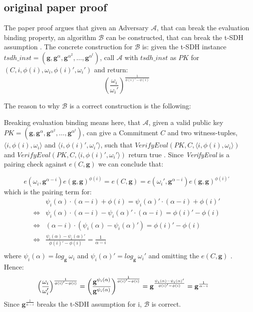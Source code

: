 \subsection{original paper proof}
The paper proof argues that given an Adversary $\mathcal{A}$, that can break the evaluation binding property, an algorithm $\mathcal{B}$ can be constructed, that can break the t-SDH assumption \parencite{KZG}. The concrete construction for $\mathcal{B}$ is: given the t-SDH instance $tsdh\_inst =(\mathbf{g}, \mathbf{g}^{\alpha}, \mathbf{g}^{\alpha^2},\dots, \mathbf{g}^{\alpha^t})$, call $\mathcal{A}$ with $tsdh\_inst$ as $PK$ for $(C,i,\phi(i),\omega_i,\phi(i)',\omega_i')$ and return: 
$$(\frac{\omega_i}{\omega_i'})^{\frac{1}{\phi(i)'-\phi(i)}}$$

The reason to why $\mathcal{B}$ is a correct construction is the following: 

Breaking evaluation binding means here, that $\mathcal{A}$, given a valid public key $PK=(\mathbf{g}, \mathbf{g}^{\alpha}, \mathbf{g}^{\alpha^2},\dots, \mathbf{g}^{\alpha^t})$, can give a Commitment $C$ and two witness-tuples, $\langle i, \phi(i),\omega_i\rangle$ and $\langle i, \phi(i)', \omega_i'\rangle$, such that $VerifyEval(PK, C,\langle i,\phi(i), \omega_i\rangle )$ and $VerifyEval(PK, C,\langle i,\phi(i)', \omega_i'\rangle )$ return true \parencite{KZG}. Since \textit{VerifyEval} is a pairing check against $e(C,\mathbf{g})$ we can conclude that: 

$$e(\omega_i,\mathbf{g}^{\alpha-i})e(\mathbf{g}, \mathbf{g})^{\phi(i)} = e(C,\mathbf{g}) = e(\omega_i',\mathbf{g}^{\alpha-i})e(\mathbf{g}, \mathbf{g})^{\phi(i)'}$$
which is the pairing term for: 
\begin{equation*}
    \begin{aligned}
        &\psi_i(\alpha) \cdot (\alpha-i) + \phi(i) = \psi_i(\alpha)' \cdot (\alpha-i) + \phi(i)' \\
        \iff&  \psi_i(\alpha) \cdot (\alpha-i) - \psi_i(\alpha)' \cdot (\alpha-i) = \phi(i)' - \phi(i)\\
        \iff& (\alpha-i)  \cdot (\psi_i(\alpha) - \psi_i(\alpha)') = \phi(i)' - \phi(i)\\
        \iff& \frac{\psi_i(\alpha) - \psi_i(\alpha)'}{\phi(i)' - \phi(i)} = \frac{1}{\alpha - i}\\
    \end{aligned}
\end{equation*}
where $\psi_i(\alpha)= log_{\mathbf{g}}\ \omega_i$ and $\psi_i(\alpha)'= log_{\mathbf{g}}\ \omega_i'$ and omitting the $e(C,\mathbf{g})$
\parencite{KZG}.
Hence: 
\begin{equation*}
    \begin{aligned}
        &\Bigl(\frac{\omega_i}{\omega_i'}\Bigr)^{\frac{1}{\phi(i)'-\phi(i)}} 
        = \biggl(\frac{\mathbf{g}^{\psi_i(\alpha)}}{\mathbf{g}^{\psi_i(\alpha)}}\biggr)^{\frac{1}{\phi(i)'-\phi(i)}}
        = \mathbf{g}^{\frac{\psi_i(\alpha) - \psi_i(\alpha)'}{\phi(i)' - \phi(i)}}
        = \mathbf{g}^{\frac{1}{\alpha-i}}
    \end{aligned}
\end{equation*}
Since $\mathbf{g}^{\frac{1}{\alpha-i}}$ breaks the t-SDH assumption for i, $\mathcal{B}$ is correct.

